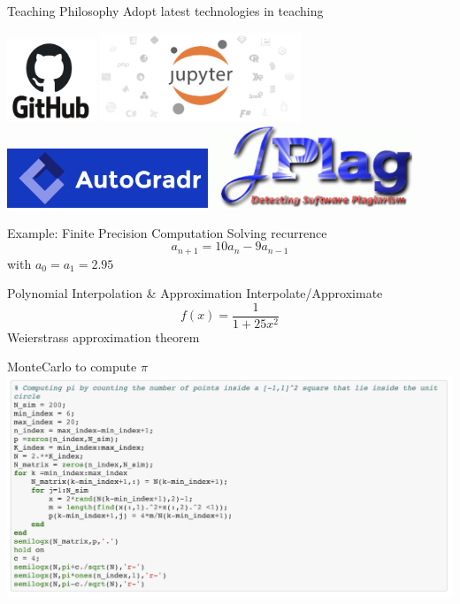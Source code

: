 \documentclass{beamer}
\begin{document}
\begin{frame}[c]{Teaching Philosophy}
	\LARGE
	Adopt latest technologies in teaching
	\begin{center}
	\includegraphics[width=0.2\textwidth]{./images/Github.png} \hspace{1em}
	\includegraphics[width=0.45\textwidth]{./images/Jupyter.png}\\
	\vspace{1em}
	\includegraphics[width=0.45\textwidth]{./images/AutoGradr.png} \hspace{1em}
	\includegraphics[width=0.45\textwidth]{./images/JPlag.png}
	\end{center}
\end{frame}

\begin{frame}{Example: Finite Precision Computation}
	\LARGE
	Solving recurrence
	$$a_{n+1} = 10a_n - 9a_{n-1}$$
	with $a_0 = a_1 = 2.95$
\end{frame}

\begin{frame}{Polynomial Interpolation \& Approximation}
	\LARGE
	Interpolate/Approximate
	$$f(x) = \dfrac1{1+25x^2}$$
	Weierstrass approximation theorem
\end{frame}

\begin{frame}{MonteCarlo to compute $\pi$}
	\includegraphics[width=\textwidth]{./images/pi_1.png}
\end{frame}
\end{document}
